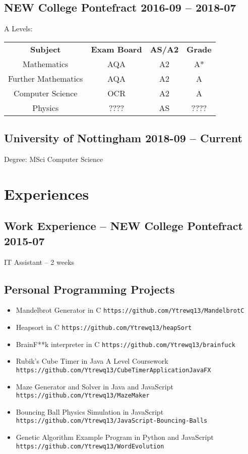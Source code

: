 \documentclass[9pt]{extarticle}
\begin{document}
    \subsection{NEW College Pontefract
    \hfill 2016-09 -- 2018-07}
    A Levels:
    \begin{tabular}{cccc}
        \textbf{Subject} & \textbf{Exam Board} & \textbf{AS/A2} & \textbf{Grade} \\
        Mathematics & AQA & A2 & A* \\
        Further Mathematics & AQA & A2 & A \\
        Computer Science & OCR & A2 & A \\
        Physics & ???? & AS & ????
    \end{tabular}
    \subsection{University of Nottingham
    \hfill 2018-09 -- Current}
    Degree: MSci Computer Science
    \section{Experiences}
    \subsection{Work Experience -- NEW College Pontefract
    \hfill 2015-07}
    IT Assistant
    --
    2 weeks
    \subsection{Personal Programming Projects}
    \begin{itemize}
        \item Mandelbrot Generator in C
            \hfill
            \texttt{https://github.com/Ytrewq13/MandelbrotC}
        \item Heapsort in C
            \hfill
            \texttt{https://github.com/Ytrewq13/heapSort}
        \item BrainF**k interpreter in C
            \hfill
            \texttt{https://github.com/Ytrewq13/brainfuck}
        \item Rubik's Cube Timer in Java
            \hfill
            A Level Coursework
            \hfill
            \texttt{https://github.com/Ytrewq13/CubeTimerApplicationJavaFX}
        \item Maze Generator and Solver in Java and JavaScript
            \hfill
            \texttt{https://github.com/Ytrewq13/MazeMaker}
        \item Bouncing Ball Physics Simulation in JavaScript
            \hfill
            \texttt{https://github.com/Ytrewq13/JavaScript-Bouncing-Balls}
        \item Genetic Algorithm Example Program in Python and JavaScript
            \hfill
            \texttt{https://github.com/Ytrewq13/WordEvolution}
    \end{itemize}
\end{document}
